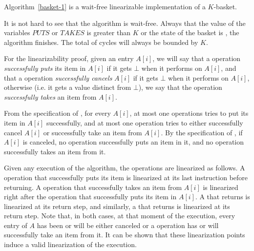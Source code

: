 \begin{theorem}\label{theorem:k-basket}
Algorithm~\ref{basket-1} is a wait-free linearizable implementation of a $K$-basket.
\end{theorem}

\begin{proofT}
It is not hard to see that the algorithm is wait-free. Always that the value of the variables \(PUTS\) or \(TAKES\) is greater than \(K\) or the state of the basket is \closed, the algorithm finishes. The total of cycles will always be bounded by \(K\).

For the linearizability proof, given an entry $A[i]$, we will say that a \Put operation \emph{successfully puts} its item in $A[i]$ if it gets $\bot$ when it performs \SWAP on $A[i]$, and that a \Take operation \emph{successfully cancels} $A[i]$ if it gets $\bot$ when it performs \SWAP on $A[i]$, otherwise (i.e. it gets a value distinct from $\bot$), we say that the \Take operation \emph{successfully takes} an item from $A[i]$.

From the specification of \FAI, for every $A[i]$, at most one \Put operations tries to put its item in $A[i]$ successfully, and at most one \Take operation tries to either successfully cancel $A[i]$ or successfully take an item from $A[i]$. By the specification of \SWAP, if $A[i]$ is canceled, no \Put operation successfully puts an item in it, and no \Take operation successfully takes an item from it.

Given any execution of the algorithm, the operations are linearized as follows. A \Put operation that successfully puts its item is linearized at its last \FAI instruction before returning. A \Take operation that successfully takes an item from $A[i]$ is linearized right after the \Put operation that successfully puts its item in $A[i]$. A \Put that returns \full is linearized at its return step, and similarly, a \Take that returns \closed is linearized at its return step. Note that, in both cases, at that moment of the execution, every entry of $A$ has been or will be either canceled or a \Take operation has or will successfully take an item from it. It can be shown that these linearization points induce a valid linearization of the execution.
\end{proofT}

